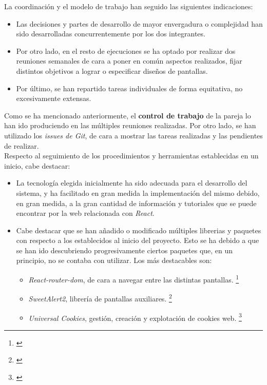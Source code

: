 \documentclass[11pt, a4paper, titlepage]{article}
\begin{document}
La coordinación y el modelo de trabajo han seguido las siguientes indicaciones:

\begin{itemize}
    \item Las decisiones y partes de desarrollo de mayor envergadura o complejidad han sido desarrolladas concurrentemente por los dos integrantes. 
    \item Por otro lado, en el resto de ejecuciones se ha optado por realizar dos reuniones semanales de cara a poner en común aspectos realizados, fijar distintos objetivos a lograr o especificar diseños de pantallas.
    \item Por último, se han repartido tareas individuales de forma equitativa, no excesivamente extensas.
\end{itemize}

Como se ha mencionado anteriormente, el \textbf{control de trabajo} de la pareja lo han ido produciendo en las múltiples reuniones realizadas. Por otro lado, se han utilizado los \textit{issues de Git}, de cara a mostrar las tareas realizadas y las pendientes de realizar. \\

Respecto al seguimiento de los procedimientos y herramientas establecidas en un inicio, cabe destacar:

\begin{itemize}
    \item La tecnología elegida inicialmente ha sido adecuada para el desarrollo del sistema, y ha facilitado en gran medida la implementación del mismo debido, en gran medida, a la gran cantidad de información y tutoriales que se puede encontrar por la web relacionada con \textit{React}.

    \item Cabe destacar que se han añadido o modificado múltiples librerias y paquetes con respecto a los establecidos al inicio del proyecto. Esto se ha debido a que se han ido descubriendo progresivamente ciertos paquetes que, en un principio, no se contaba con utilizar. Los más destacables son:
        \begin{itemize}
            \item \textit{React-router-dom}, de cara a navegar entre las distintas pantallas. \footnote{\href{https://v5.reactrouter.com/web/guides/quick-start}{}}
            \item \textit{SweetAlert2}, librería de pantallas auxiliares.
            \footnote{\href{https://sweetalert2.github.io}{}}
            \item \textit{Universal Cookies}, gestión, creación y explotación de cookies web.
            \footnote{\href{https://www.npmjs.com/package/universal-cookie}{}}
        \end{itemize}
\end{itemize}
\end{document}
